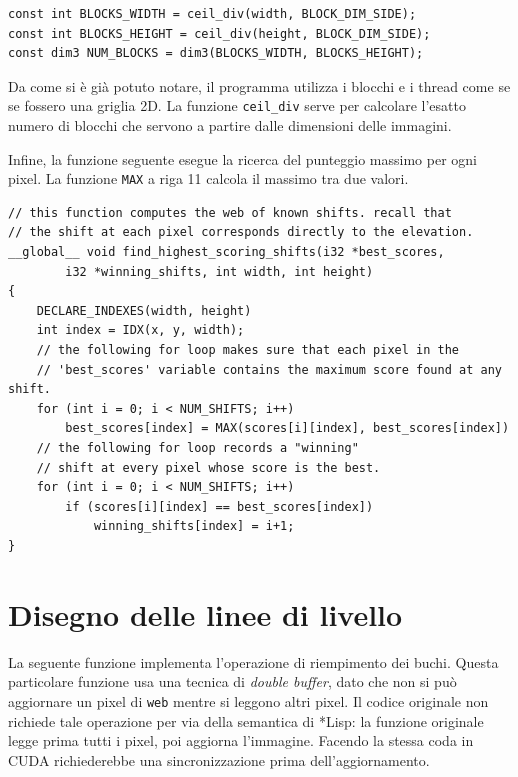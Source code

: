 \documentclass[12pt,a4paper,openright,twoside]{report}
\begin{document}
\begin{lstlisting}[style=mystyle]
const int BLOCKS_WIDTH = ceil_div(width, BLOCK_DIM_SIDE);
const int BLOCKS_HEIGHT = ceil_div(height, BLOCK_DIM_SIDE);
const dim3 NUM_BLOCKS = dim3(BLOCKS_WIDTH, BLOCKS_HEIGHT);
\end{lstlisting}

Da come si è già potuto notare, il programma utilizza i blocchi e i thread come se se fossero una griglia 2D. La funzione \verb|ceil_div| serve per calcolare l'esatto numero di blocchi che servono a partire dalle dimensioni delle immagini.


Infine, la funzione seguente esegue la ricerca del punteggio massimo per ogni pixel. La funzione \verb|MAX| a riga 11 calcola il massimo tra due valori.

\begin{lstlisting}[style=mystyle]
// this function computes the web of known shifts. recall that
// the shift at each pixel corresponds directly to the elevation.
__global__ void find_highest_scoring_shifts(i32 *best_scores,
        i32 *winning_shifts, int width, int height)
{
    DECLARE_INDEXES(width, height)
    int index = IDX(x, y, width);
    // the following for loop makes sure that each pixel in the
    // 'best_scores' variable contains the maximum score found at any shift.
    for (int i = 0; i < NUM_SHIFTS; i++)
        best_scores[index] = MAX(scores[i][index], best_scores[index])
    // the following for loop records a "winning"
    // shift at every pixel whose score is the best.
    for (int i = 0; i < NUM_SHIFTS; i++)
        if (scores[i][index] == best_scores[index])
            winning_shifts[index] = i+1;
}
\end{lstlisting}

\section{Disegno delle linee di livello}

La seguente funzione implementa l'operazione di riempimento dei buchi. Questa particolare funzione usa una tecnica di \textit{double buffer}, dato che non si può aggiornare un pixel di \verb|web| mentre si leggono altri pixel. Il codice originale non richiede tale operazione per via della semantica di *Lisp: la funzione originale legge prima tutti i pixel, poi aggiorna l'immagine. Facendo la stessa coda in CUDA richiederebbe una sincronizzazione prima dell'aggiornamento.
\end{document}
